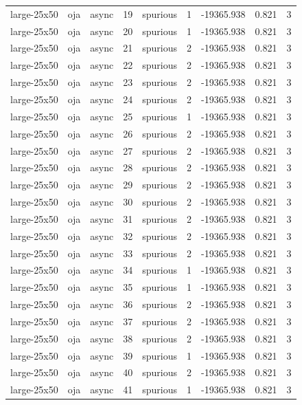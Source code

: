 \begin{tabular}{lllrlrrrr}
large-25x50 & oja & async & 19 & spurious & 1 & -19365.938 & 0.821 & 3 \\
large-25x50 & oja & async & 20 & spurious & 1 & -19365.938 & 0.821 & 3 \\
large-25x50 & oja & async & 21 & spurious & 2 & -19365.938 & 0.821 & 3 \\
large-25x50 & oja & async & 22 & spurious & 2 & -19365.938 & 0.821 & 3 \\
large-25x50 & oja & async & 23 & spurious & 2 & -19365.938 & 0.821 & 3 \\
large-25x50 & oja & async & 24 & spurious & 2 & -19365.938 & 0.821 & 3 \\
large-25x50 & oja & async & 25 & spurious & 1 & -19365.938 & 0.821 & 3 \\
large-25x50 & oja & async & 26 & spurious & 2 & -19365.938 & 0.821 & 3 \\
large-25x50 & oja & async & 27 & spurious & 2 & -19365.938 & 0.821 & 3 \\
large-25x50 & oja & async & 28 & spurious & 2 & -19365.938 & 0.821 & 3 \\
large-25x50 & oja & async & 29 & spurious & 2 & -19365.938 & 0.821 & 3 \\
large-25x50 & oja & async & 30 & spurious & 2 & -19365.938 & 0.821 & 3 \\
large-25x50 & oja & async & 31 & spurious & 2 & -19365.938 & 0.821 & 3 \\
large-25x50 & oja & async & 32 & spurious & 2 & -19365.938 & 0.821 & 3 \\
large-25x50 & oja & async & 33 & spurious & 2 & -19365.938 & 0.821 & 3 \\
large-25x50 & oja & async & 34 & spurious & 1 & -19365.938 & 0.821 & 3 \\
large-25x50 & oja & async & 35 & spurious & 1 & -19365.938 & 0.821 & 3 \\
large-25x50 & oja & async & 36 & spurious & 2 & -19365.938 & 0.821 & 3 \\
large-25x50 & oja & async & 37 & spurious & 2 & -19365.938 & 0.821 & 3 \\
large-25x50 & oja & async & 38 & spurious & 2 & -19365.938 & 0.821 & 3 \\
large-25x50 & oja & async & 39 & spurious & 1 & -19365.938 & 0.821 & 3 \\
large-25x50 & oja & async & 40 & spurious & 2 & -19365.938 & 0.821 & 3 \\
large-25x50 & oja & async & 41 & spurious & 1 & -19365.938 & 0.821 & 3 \\

\end{tabular}
